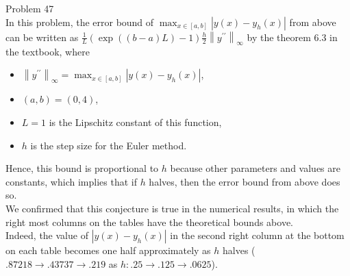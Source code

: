 \documentclass[dvipdfmx]{article}
\newcommand{\norm}[1]{\left\lVert#1\right\rVert}
\begin{document}
Problem 47\\
In this problem, the error bound of $\max_{x \in [a,b]}\left|y(x)-y_h(x)\right|$
from above can be written as 
$\frac{1}{L}\left(\exp\left((b-a)L\right) - 1\right) \frac{h}{2} \norm{y^{\prime\prime}}_{\infty}$ 
by the theorem $6.3$ in the textbook, 
where 
\begin{itemize}
  \item $\norm{y^{\prime\prime}}_{\infty} = \max_{x \in [a,b]}\left|y(x)-y_h(x)\right|$,
  \item $(a,b) = (0, 4)$,
  \item $L = 1$ is the Lipschitz constant of this function, 
  \item $h$ is the step size for the Euler method.
\end{itemize}
Hence, this bound is proportional to $h$ because other parameters and values are constants, which implies that if $h$ halves, then the error bound from above does so.\\
We confirmed that this conjecture is true in the numerical results, in which the right most columns on the tables have the theoretical bounds above.\\
Indeed, the value of $\left|y(x)-y_h(x)\right|$ in the second right column at the bottom on each table becomes one half approximately as $h$ halves ($.87218 \to .43737 \to .219$ as $h: .25 \to .125 \to .0625$).
\end{document}
